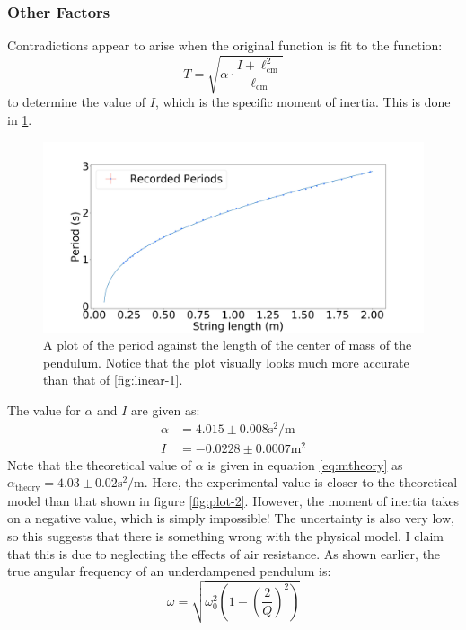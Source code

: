 \documentclass[%
 reprint,
 amsmath,amssymb
 aps,
]{revtex4-2}
\begin{document}
\subsubsection{Other Factors}
Contradictions appear to arise when the original function is fit to the function:
\begin{equation}
    T = \sqrt{\alpha \cdot \frac{I+\ell_\text{cm}^2}{\ell_\text{cm}}}
    \label{eq:moment of inertia}
\end{equation}
to determine the value of $I$, which is the specific moment of inertia. This is done in \ref{fig:normal-complex}.
\begin{figure}[!h]
    \includegraphics[width=\linewidth]{Figures/normal_complex.png}

    \caption{A plot of the period against the length of the center of mass of the pendulum. Notice that the plot visually looks much more accurate than that of \ref{fig:linear-1}.}
    \label{fig:normal-complex}
\end{figure}
The value for $\alpha$ and $I$ are given as:
\begin{align}
    \alpha &= 4.015 \pm 0.008 \si{\second\squared\per\meter}\\ 
    I &= -0.0228 \pm 0.0007 \si{\meter\squared}
\end{align}
Note that the theoretical value of $\alpha$ is given in equation \ref{eq:mtheory} as $\alpha_\text{theory}=4.03 \pm 0.02 \si{\second\squared\per\meter}$. Here, the experimental value is closer to the theoretical model than that shown in figure \ref{fig:plot-2}. However, the moment of inertia takes on a negative value, which is simply impossible! The uncertainty is also very low, so this suggests that there is something wrong with the physical model. I claim that this is due to neglecting the effects of air resistance. As shown earlier, the true angular frequency of an underdampened pendulum is:
\begin{equation}
    \omega = \sqrt{\omega_0^2\left(1-\left(\frac{2}{Q}\right)^2\right)}
    \label{eq:omegalol}
\end{equation}
\end{document}
